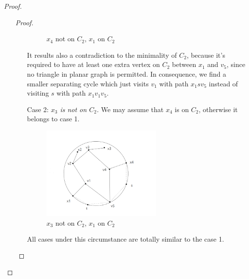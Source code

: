 \begin{proof}
\begin{itemize}
\begin{proof}
\begin{itemize}
\begin{figure}[H]
    \caption{$x_4$ not on $C_2$, $x_1$ on $C_2$} %
    \label{figure} %
    \end{figure}
    It results also a contradiction to the minimality of $C_2$, because it's required to have at least one extra vertex on $C_2$ between $x_1$ and $v_5$, since no triangle in planar graph is permitted. In consequence, we find a smaller separating cycle which just visits $v_1$ with path $x_1sv_5$ instead of visiting $s$ with path $x_1v_1v_5$.
    \item[Case 2:] \textit{\textit{$x_3$ is not on $C_2$.}} We may assume that $x_4$ is on $C_2$, otherwise it belongs to case 1. 
    \begin{figure}[H] %
    \centering %
    \includegraphics[width=0.6\textwidth]{figure/x3notonc2.png} 
    \caption{$x_3$ not on $C_2$, $x_1$ on $C_2$} %
    \label{figure} %
    \end{figure}
    All cases under this circumstance are totally similar to the case 1.
\end{itemize}
\end{proof}


\end{itemize}
\end{proof}
